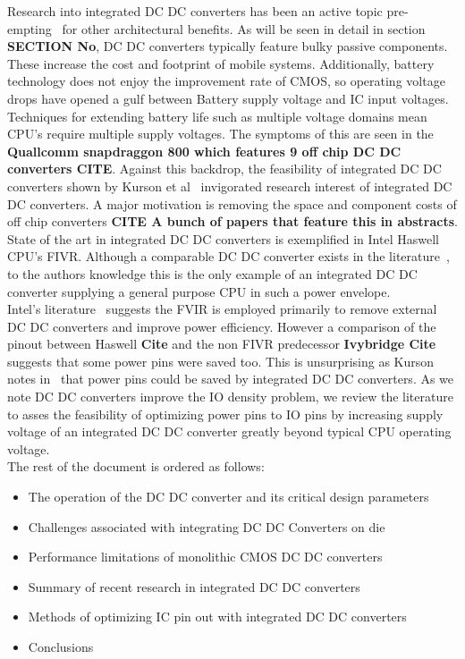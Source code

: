 \documentclass[letterpaper,twocolumn,10pt]{article}
\begin{document}
\indent Research into integrated DC DC converters has been an active topic pre-empting~\cite{Chang2010} for other architectural benefits. As will be seen in detail in section \textbf{SECTION No}, DC DC converters typically feature bulky passive components. These increase the cost and footprint of mobile systems. Additionally, battery technology does not enjoy the improvement rate of CMOS, so operating voltage drops have opened a gulf between Battery supply voltage and IC input voltages. Techniques for extending battery life such as multiple voltage domains mean CPU's require multiple supply voltages. The symptoms of this are seen in the \textbf{Quallcomm snapdraggon 800 which features 9 off chip DC DC converters CITE}. Against this backdrop, the feasibility of integrated DC DC converters shown by Kurson et al~\cite{Kurson2003} invigorated research interest of integrated DC DC converters. A major motivation is removing the space and component costs of off chip converters \textbf{CITE A bunch of papers that feature this in abstracts}.\\
\indent State of the art in integrated DC DC converters is exemplified in Intel Haswell CPU's FIVR. Although a comparable DC DC converter exists in the literature~\cite{Sturcken2012}, to the authors knowledge this is the only example of an integrated DC DC converter supplying a general purpose CPU in such a power envelope.\\
Intel's literature~\cite{Intel2010} %
suggests the FVIR is employed primarily to remove external DC DC converters and improve power efficiency. However a comparison of the pinout between Haswell \textbf{Cite} and the non FIVR predecessor \textbf{Ivybridge Cite} suggests that some power pins were saved too. This is unsurprising as Kurson notes in~\cite{Kurson2003} that power pins could be saved by integrated DC DC converters. As we note DC DC converters improve the IO density problem, we review the literature to asses the feasibility of optimizing power pins to IO pins by increasing supply voltage of an integrated DC DC converter greatly beyond typical CPU operating voltage.\\
\indent The rest of the document is ordered as follows:\\
\begin{itemize}
\item{The operation of the DC DC converter and its critical design parameters}
\item{Challenges associated with integrating DC DC Converters on die}
\item{Performance limitations of monolithic CMOS DC DC converters}
\item{Summary of recent research in integrated DC DC converters}
\item{Methods of optimizing IC pin out with integrated DC DC converters}
\item{Conclusions}
\end{itemize}
 
\end{document}
